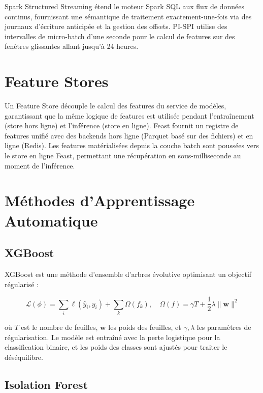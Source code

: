 \documentclass[12pt,a4paper,oneside]{book}
\theoremstyle{definition}
\theoremstyle{plain}
\begin{document}
Spark Structured Streaming \citep{armbrust2018structured} étend le moteur Spark SQL aux flux de données continus, fournissant une sémantique de traitement exactement-une-fois via des journaux d'écriture anticipée et la gestion des offsets. PI-SPI utilise des intervalles de micro-batch d'une seconde pour le calcul de features sur des fenêtres glissantes allant jusqu'à 24 heures.

\section{Feature Stores}

Un Feature Store découple le calcul des features du service de modèles, garantissant que la même logique de features est utilisée pendant l'entraînement (store hors ligne) et l'inférence (store en ligne). Feast \citep{gojek2020feast} fournit un registre de features unifié avec des backends hors ligne (Parquet basé sur des fichiers) et en ligne (Redis). Les features matérialisées depuis la couche batch sont poussées vers le store en ligne Feast, permettant une récupération en sous-milliseconde au moment de l'inférence.

\section{Méthodes d'Apprentissage Automatique}

\subsection{XGBoost}

XGBoost \citep{chen2016xgboost} est une méthode d'ensemble d'arbres évolutive optimisant un objectif régularisé :

\begin{equation}
  \mathcal{L}(\phi) = \sum_i \ell(\hat{y}_i, y_i) + \sum_k \Omega(f_k), \quad
  \Omega(f) = \gamma T + \frac{1}{2}\lambda \|\mathbf{w}\|^2
  \label{eq:xgb}
\end{equation}

où $T$ est le nombre de feuilles, $\mathbf{w}$ les poids des feuilles, et $\gamma, \lambda$ les paramètres de régularisation. Le modèle est entraîné avec la perte logistique pour la classification binaire, et les poids des classes sont ajustés pour traiter le déséquilibre.

\subsection{Isolation Forest}
\end{document}
